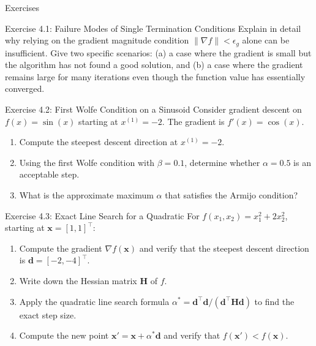 \documentclass[aspectratio=169,10pt]{beamer}
\newcommand{\bx}{\mathbf{x}}
\newcommand{\bd}{\mathbf{d}}
\newcommand{\bH}{\mathbf{H}}
\newcommand{\grad}{\nabla}
\begin{document}
\begin{frame}[allowframebreaks]{Exercises}

  \begin{block}{Exercise 4.1: Failure Modes of Single Termination Conditions}
    Explain in detail why relying on the gradient magnitude condition
    $\|\grad f\| < \epsilon_g$ alone can be insufficient.  Give two
    specific scenarios: (a) a case where the gradient is small but the
    algorithm has not found a good solution, and (b) a case where the
    gradient remains large for many iterations even though the function
    value has essentially converged.
  \end{block}

  \begin{block}{Exercise 4.2: First Wolfe Condition on a Sinusoid}
    Consider gradient descent on $f(x) = \sin(x)$ starting at
    $x^{(1)} = -2$.  The gradient is $f'(x) = \cos(x)$.
    \begin{enumerate}
      \item Compute the steepest descent direction at $x^{(1)} = -2$.
      \item Using the first Wolfe condition with $\beta = 0.1$, determine
            whether $\alpha = 0.5$ is an acceptable step.
      \item What is the approximate maximum $\alpha$ that satisfies the
            Armijo condition?
    \end{enumerate}
  \end{block}

  \framebreak

  \begin{block}{Exercise 4.3: Exact Line Search for a Quadratic}
    For $f(x_1, x_2) = x_1^2 + 2x_2^2$, starting at
    $\bx = [1, 1]^{\top}$:
    \begin{enumerate}
      \item Compute the gradient $\grad f(\bx)$ and verify that the
            steepest descent direction is $\bd = [-2, -4]^{\top}$.
      \item Write down the Hessian matrix $\bH$ of $f$.
      \item Apply the quadratic line search formula
            $\alpha^* = \bd^{\top}\bd / (\bd^{\top}\bH\bd)$
            to find the exact step size.
      \item Compute the new point $\bx' = \bx + \alpha^*\bd$ and verify
            that $f(\bx') < f(\bx)$.
    \end{enumerate}
  \end{block}


\end{frame}
\end{document}
